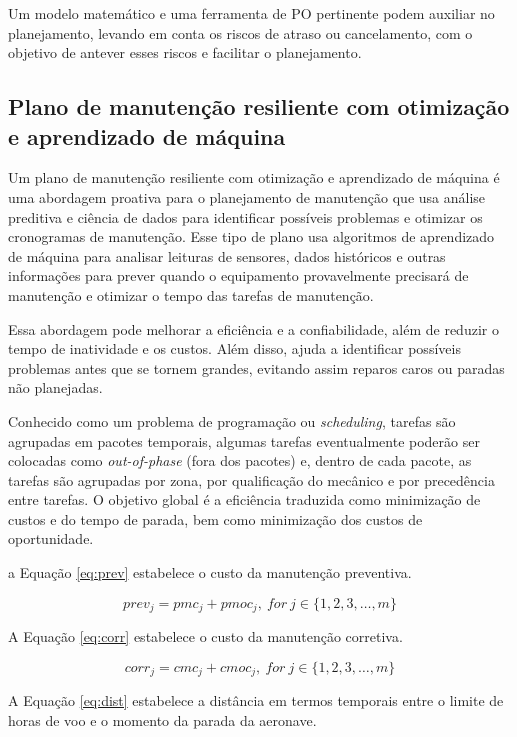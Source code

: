\documentclass{article}
\begin{document}
Um modelo matemático e uma ferramenta de PO pertinente podem auxiliar no planejamento, levando em conta os riscos de atraso ou cancelamento, com o objetivo de antever esses riscos e facilitar o planejamento.

\subsection{Plano de manutenção resiliente com otimização e aprendizado de máquina}

Um plano de manutenção resiliente com otimização e aprendizado de máquina é uma abordagem proativa para o planejamento de manutenção que usa análise preditiva e ciência de dados para identificar possíveis problemas e otimizar os cronogramas de manutenção.
Esse tipo de plano usa algoritmos de aprendizado de máquina para analisar leituras de sensores, dados históricos e outras informações para prever quando o equipamento provavelmente precisará de manutenção e otimizar o tempo das tarefas de manutenção.

Essa abordagem pode melhorar a eficiência e a confiabilidade, além de reduzir o tempo de inatividade e os custos. Além disso, ajuda a identificar possíveis problemas antes que se tornem grandes, evitando assim reparos caros ou paradas não planejadas.

Conhecido como um problema de programação ou {\it scheduling}, tarefas são agrupadas em pacotes temporais, algumas tarefas eventualmente poderão ser colocadas como {\it out-of-phase} (fora dos pacotes) e, dentro de cada pacote, as tarefas são agrupadas por zona, por qualificação do mecânico e por precedência entre tarefas.
O objetivo global é a eficiência traduzida como minimização de custos e do tempo de parada, bem como minimização dos custos de oportunidade.

a Equação \ref{eq:prev} estabelece o custo da manutenção preventiva.


\begin{equation}\label{eq:prev}
prev_j =  pmc_j + pmoc_j,\ for\ j \in \{1, 2, 3, \ldots, m\}
\end{equation}


A Equação \ref{eq:corr} estabelece o custo da manutenção corretiva.

\begin{equation}\label{eq:corr}
corr_j =  cmc_j + cmoc_j,\ for\ j \in \{1, 2, 3, \ldots, m\}
\end{equation}


A Equação  \ref{eq:dist} estabelece a distância em termos temporais entre o limite de horas de voo e o momento da parada da aeronave.
\end{document}
